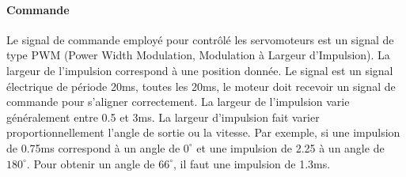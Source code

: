 				\paragraph{Commande}Le signal de commande employé pour contrôlé les servomoteurs est un signal de type PWM (Power Width Modulation, Modulation à Largeur d'Impulsion). La largeur de l'impulsion correspond à une position donnée. Le signal est un signal électrique de période 20ms, toutes les 20ms, le moteur doit recevoir un signal de commande pour s'aligner correctement. La largeur de l'impulsion varie généralement entre 0.5 et 3ms. La largeur d'impulsion fait varier proportionnellement l'angle de sortie ou la vitesse. Par exemple, si une impulsion de 0.75ms correspond à un angle de $0^{\circ}$ et une impulsion de 2.25 à un angle de $180^{\circ}$. Pour obtenir un angle de $66^{\circ}$, il faut une impulsion de 1.3ms.  
			
